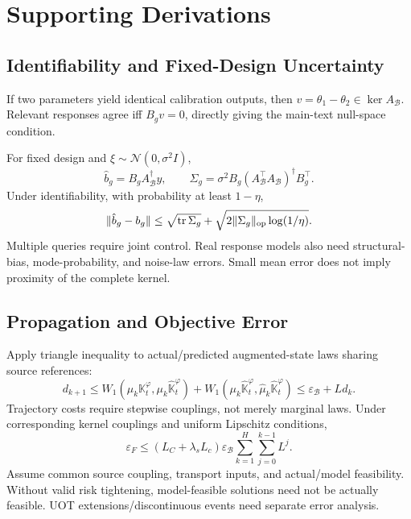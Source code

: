 \documentclass[11pt]{article}
\newcommand{\tr}{\operatorname{tr}}
\begin{document}
\appendix
\section{Supporting Derivations}
\subsection{Identifiability and Fixed-Design Uncertainty}
If two parameters yield identical calibration outputs, then
$v=\theta_1-\theta_2\in\ker A_{\mathcal B}$. Relevant responses agree iff $B_gv=0$,
directly giving the main-text null-space condition.

For fixed design and $\xi\sim\mathcal N(0,\sigma^2I)$,
\begin{equation}
 \hat b_g=B_gA_{\mathcal B}^\dagger y,\qquad
 \Sigma_g=\sigma^2B_g(A_{\mathcal B}^\top A_{\mathcal B})^\dagger B_g^\top.
\end{equation}
Under identifiability, with probability at least $1-\eta$,
\begin{equation}
 \|\hat b_g-b_g\|\le
 \sqrt{\tr\Sigma_g}+\sqrt{2\|\Sigma_g\|_{\rm op}\log(1/\eta)}.
\end{equation}
Multiple queries require joint control. Real response models also need structural-
bias, mode-probability, and noise-law errors. Small mean error does not imply proximity
of the complete kernel.

\subsection{Propagation and Objective Error}
Apply triangle inequality to actual/predicted augmented-state laws sharing source references:
\begin{equation}
 d_{k+1}\le
 W_1(\mu_k\mathbb K_t^\varphi,\mu_k\widehat{\mathbb K}_t^\varphi)
 +W_1(\mu_k\widehat{\mathbb K}_t^\varphi,\hat\mu_k\widehat{\mathbb K}_t^\varphi)
 \le\varepsilon_{\mathcal B}+Ld_k.
\end{equation}
Trajectory costs require stepwise couplings, not merely marginal laws. Under corresponding
kernel couplings and uniform Lipschitz conditions,
\begin{equation}
 \varepsilon_F\le
 (L_C+\lambda_sL_c)\varepsilon_{\mathcal B}
 \sum_{k=1}^{H}\sum_{j=0}^{k-1}L^j.
\end{equation}
Assume common source coupling, transport inputs, and actual/model feasibility. Without
valid risk tightening, model-feasible solutions need not be actually feasible.
UOT extensions/discontinuous events need separate error analysis.
\end{document}
